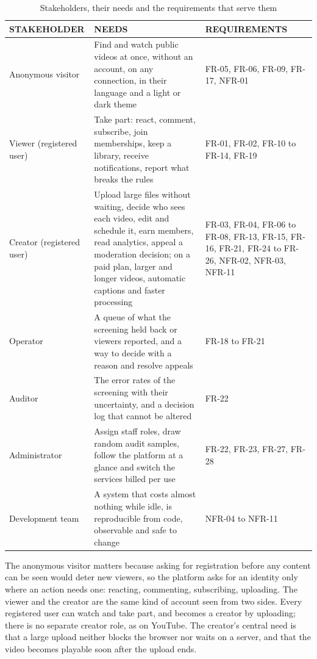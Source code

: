 \begin{table}[htbp]
\centering
\caption{Stakeholders, their needs and the requirements that serve them}
\label{tab:stakeholders}
\small
\begin{tabularx}{\textwidth}{>{\raggedright\arraybackslash}p{} X >{\raggedright\arraybackslash}p{}}
\toprule
\textbf{STAKEHOLDER} & \textbf{NEEDS} & \textbf{REQUIREMENTS} \\
\midrule
Anonymous visitor & Find and watch public videos at once, without an account, on any connection, in their language and a light or dark theme & FR-05, FR-06, FR-09, FR-17, NFR-01 \\
Viewer (registered user) & Take part: react, comment, subscribe, join memberships, keep a library, receive notifications, report what breaks the rules & FR-01, FR-02, FR-10 to FR-14, FR-19 \\
Creator (registered user) & Upload large files without waiting, decide who sees each video, edit and schedule it, earn members, read analytics, appeal a moderation decision; on a paid plan, larger and longer videos, automatic captions and faster processing & FR-03, FR-04, FR-06 to FR-08, FR-13, FR-15, FR-16, FR-21, FR-24 to FR-26, NFR-02, NFR-03, NFR-11 \\
Operator & A queue of what the screening held back or viewers reported, and a way to decide with a reason and resolve appeals & FR-18 to FR-21 \\
Auditor & The error rates of the screening with their uncertainty, and a decision log that cannot be altered & FR-22 \\
Administrator & Assign staff roles, draw random audit samples, follow the platform at a glance and switch the services billed per use & FR-22, FR-23, FR-27, FR-28 \\
Development team & A system that costs almost nothing while idle, is reproducible from code, observable and safe to change & NFR-04 to NFR-11 \\
\bottomrule
\end{tabularx}
\end{table}

The anonymous visitor matters because asking for registration before any content can be seen would
deter new viewers, so the platform asks for an identity only where an action needs one: reacting,
commenting, subscribing, uploading. The viewer and the creator are the same kind of account seen
from two sides. Every registered user can watch and take part, and becomes a creator by uploading;
there is no separate creator role, as on YouTube. The creator's central need is that a large upload
neither blocks the browser nor waits on a server, and that the video becomes playable soon after the
upload ends.


